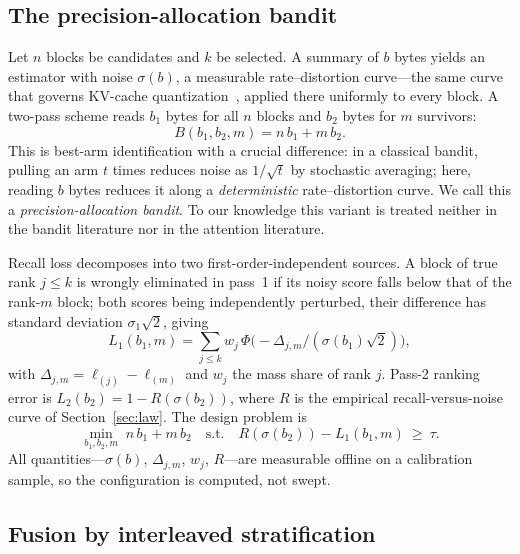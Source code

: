 \documentclass[sigconf,nonacm,11pt]{acmart}
\begin{document}
\subsection{The precision-allocation bandit}

Let $n$ blocks be candidates and $k$ be selected. A summary of $b$ bytes yields an
estimator with noise $\sigma(b)$, a measurable rate--distortion curve---the same
curve that governs KV-cache quantization~\cite{turboquant2025,blockgtq2026}, applied
there uniformly to every block. A two-pass
scheme reads $b_1$ bytes for all $n$ blocks and $b_2$ bytes for $m$ survivors:
\begin{equation}
B(b_1,b_2,m)=n\,b_1+m\,b_2 .
\end{equation}
This is best-arm identification with a crucial difference: in a classical bandit,
pulling an arm $t$ times reduces noise as $1/\sqrt t$ by stochastic averaging;
here, reading $b$ bytes reduces it along a \emph{deterministic} rate--distortion
curve. We call this a \emph{precision-allocation bandit}. To our knowledge this
variant is treated neither in the bandit literature nor in the attention literature.

Recall loss decomposes into two first-order-independent sources. A block of true
rank $j\le k$ is wrongly eliminated in pass~1 if its noisy score falls below that
of the rank-$m$ block; both scores being independently perturbed, their difference
has standard deviation $\sigma_1\sqrt2$, giving
\begin{equation}
L_1(b_1,m)=\sum_{j\le k} w_j\,\Phi\!\Big(\!-\Delta_{j,m}\big/(\sigma(b_1)\sqrt2)\Big),
\label{eq:l1}
\end{equation}
with $\Delta_{j,m}=\ell_{(j)}-\ell_{(m)}$ and $w_j$ the mass share of rank $j$.
Pass-2 ranking error is $L_2(b_2)=1-R(\sigma(b_2))$, where $R$ is the empirical
recall-versus-noise curve of Section~\ref{sec:law}. The design problem is
\begin{equation}
\min_{b_1,b_2,m} \; n\,b_1+m\,b_2
\quad\text{s.t.}\quad R(\sigma(b_2))-L_1(b_1,m)\ \ge\ \tau .
\end{equation}
All quantities---$\sigma(b)$, $\Delta_{j,m}$, $w_j$, $R$---are measurable offline
on a calibration sample, so the configuration is computed, not swept.

\subsection{Fusion by interleaved stratification}\label{sec:fusion}
\end{document}
